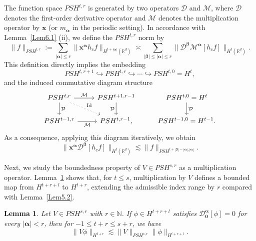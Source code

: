 \documentclass{sn-jnl}%
\newcommand{\bnm}[1]{\bigl\| #1 \bigr\|}
\numberwithin{equation}{section}
\theoremstyle{thmstyleone}%
\newtheorem{lemma}{Lemma}[section]%
\theoremstyle{thmstyletwo}%
\theoremstyle{thmstylethree}%
\begin{document}
The function space $PSH^{t,r}$ is generated by two operators $\mathcal{D}$ and $\mathcal{M}$, where $\mathcal{D}$ denotes the first-order derivative operator and $\mathcal{M}$ denotes the multiplication operator by $\bm x$ (or $m_{\bm \alpha}$ in the periodic setting). 
In accordance with Lemma~\ref{Lem6.1} (ii), we define the $PSH^{t,r}$ norm by
\begin{equation}\label{eq-sec6.1-03.1}
    \|f\|_{PSH^{t,r}}:= \sum_{|\bm \alpha|\leq r}\bnm{\bm x^{\bm \alpha }h_cf}_{H^{t+|\bm \alpha|}(\mathbb{R}^d)} \asymp \sum_{|\bm \beta|\leq |\bm \alpha|\leq r}\bnm{\mathcal{D}^{\bm \beta}\mathcal{M}^{\bm \alpha}[h_c f]}_{H^{t}(\mathbb{R}^d)} .
\end{equation}
This definition directly implies the embedding
\begin{equation}\label{eq-sec6.1-03}
    PSH^{t,r+1}\hookrightarrow PSH^{t,r}\hookrightarrow \cdots\hookrightarrow PSH^{t,0}=H^{t},
\end{equation}
and the induced commutative diagram structure 
\begin{equation}\label{eq-sec6.1-diag}
\begin{tikzcd}
PSH^{t,r}
  \arrow[r,"\mathcal{M}"]
  \arrow[d,"\mathcal{D}"]
  \arrow[rd,dotted,"\mathrm{Id}"]
&
PSH^{t+1,r-1}
  \arrow[d,"\mathcal{D}"']
&
PSH^{t,0} = H^{t}
    \arrow[d,"\mathcal{D}"]
\\
PSH^{t-1,r}
  \arrow[r,"\mathcal{M}"']
&
PSH^{t,r-1},
&
PSH^{t-1,0} = H^{t-1}.
\end{tikzcd}
\end{equation}
As a consequence, applying this diagram iteratively, we obtain
\begin{equation}\label{eq-sec6.1-04}
    \bnm{\bm x^{\bm \alpha}\mathcal{D}^{\bm \beta}[h_cf]}_{H^{t}(\mathbb{R}^d)}\lesssim \|f\|_{PSH^{t+|\bm \beta|-|\bm \alpha|,|\bm \alpha|}}.
\end{equation}







Next, we study the boundedness property of  $V \in PSH^{s,r}$ as a multiplication operator. Lemma~\ref{Lem6.2} shows that, for $t\leq s$, multiplication by $V$ defines a bounded map from $H^{t+r+l}$ to $H^{t+r}$, extending the admissible index range by $r$ compared with Lemma~\ref{Lem5.2}.

\begin{lemma}\label{Lem6.2}
    Let $V \in PSH^{s,r}$ with $r\in\mathbb{N}$. If $\phi \in H^{t+r+l}$ satisfies $ \mathcal{D}^{\bm \alpha}_{\bm 0}[\phi]=0$ for every $\bm |\bm \alpha| <r$, then for $-1\leq t+r\leq s+r$, we have
        \begin{equation}\label{eq-Lem6.2-01}
        \|V\phi\|_{H^{t+r}}\lesssim \|V\|_{PSH^{s,r}}\| \phi \|_{H^{t+r+l}}.
        \end{equation}
\end{lemma}
\end{document}
